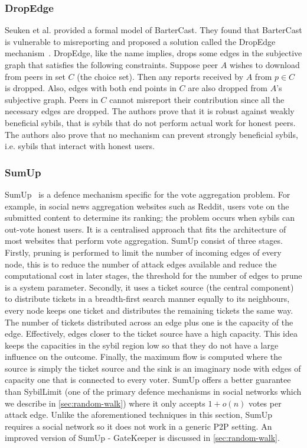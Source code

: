 \subsubsection{DropEdge}
Seuken et al. provided a formal model of BarterCast. They found that BarterCast
is vulnerable to misreporting and proposed a solution called the DropEdge
mechanism~\cite{seuken2011sybil, seuken2014sybil}. DropEdge, like the name
implies, drops some edges in the subjective graph that satisfies the following
constraints. Suppose peer $A$ wishes to download from peers in set $C$ (the
choice set). Then any reports received by $A$ from $p \in C$ is dropped. Also,
edges with both end points in $C$ are also dropped from $A$'s subjective graph.
Peers in $C$ cannot misreport their contribution since all the necessary edges
are dropped. The authors prove that it is robust against weakly beneficial
sybils, that is sybils that do not perform actual work for honest peers. The
authors also prove that no mechanism can prevent strongly beneficial sybils,
i.e. sybils that interact with honest users.

\subsubsection{SumUp}
SumUp~\cite{tran2009sybil} is a defence mechanism specific for the vote
aggregation problem. For example, in social news aggregation websites such as
Reddit, users vote on the submitted content to determine its ranking; the
problem occurs when sybils can out-vote honest users. It is a centralised
approach that fits the architecture of most websites that perform vote
aggregation. SumUp consist of three stages. Firstly, pruning is performed to
limit the number of incoming edges of every node, this is to reduce the number
of attack edges available and reduce the computational cost in later stages, the
threshold for the number of edges to prune is a system parameter. Secondly, it
uses a ticket source (the central component) to distribute tickets in a
breadth-first search manner equally to its neighbours, every node keeps one
ticket and distributes the remaining tickets the same way. The number of tickets
distributed across an edge plus one is the capacity of the edge. Effectively,
edges closer to the ticket source have a high capacity. This idea keeps the
capacities in the sybil region low so that they do not have a large influence on
the outcome. Finally, the maximum flow is computed where the source is simply
the ticket source and the sink is an imaginary node with edges of capacity one
that is connected to every voter. SumUp offers a better guarantee than
SybilLimit (one of the primary defence mechanisms in social networks which we
describe in \autoref{sec:random-walk}) where it only accepts $1 + o(n)$ votes
per attack edge. Unlike the aforementioned techniques in this section, SumUp
requires a social network so it does not work in a generic P2P setting. An
improved version of SumUp - GateKeeper is discussed in
\autoref{sec:random-walk}.

